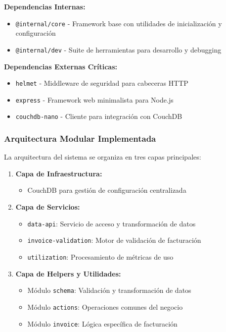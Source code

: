 \textbf{Dependencias Internas:}
\begin{itemize}
    \item \texttt{@internal/core} - Framework base con utilidades de inicialización y configuración
    \item \texttt{@internal/dev} - Suite de herramientas para desarrollo y debugging
\end{itemize}

\textbf{Dependencias Externas Críticas:}
\begin{itemize}
    \item \texttt{helmet} - Middleware de seguridad para cabeceras HTTP
    \item \texttt{express} - Framework web minimalista para Node.js
    \item \texttt{couchdb-nano} - Cliente para integración con CouchDB
\end{itemize}

\subsubsection{Arquitectura Modular Implementada}

La arquitectura del sistema se organiza en tres capas principales:

\begin{enumerate}
    \item \textbf{Capa de Infraestructura:}
          \begin{itemize}
              \item CouchDB para gestión de configuración centralizada
          \end{itemize}

    \item \textbf{Capa de Servicios:}
          \begin{itemize}
              \item \texttt{data-api}: Servicio de acceso y transformación de datos
              \item \texttt{invoice-validation}: Motor de validación de facturación
              \item \texttt{utilization}: Procesamiento de métricas de uso
          \end{itemize}

    \item \textbf{Capa de Helpers y Utilidades:}
          \begin{itemize}
              \item Módulo \texttt{schema}: Validación y transformación de datos
              \item Módulo \texttt{actions}: Operaciones comunes del negocio
              \item Módulo \texttt{invoice}: Lógica específica de facturación
          \end{itemize}
\end{enumerate}

